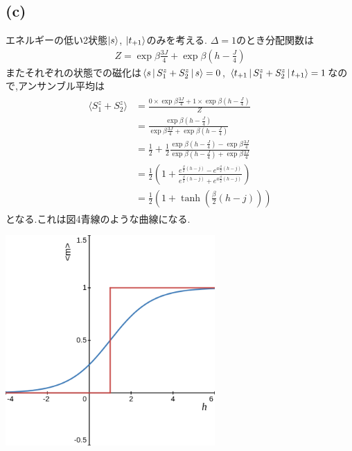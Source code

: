 \documentclass[uplatex,a4j,11pt,dvipdfmx]{jsarticle}
\makeatletter
\def\fgcaption{\def\@captype{figure}\caption}
\def\fgcaption{\def\@captype{figure}\caption}
\makeatother
\begin{document}
\subsection*{(c)}
エネルギーの低い2状態$\Ket{s}$, $\Ket{t_{+1}}$のみを考える.
$\Delta=1$のとき分配関数は
\begin{align}
  Z=\exp{\beta\frac{3J}{4}}+\exp{\beta\left(h-\frac{J}{4}\right)}
\end{align}
またそれぞれの状態での磁化は$\Braket{s|S_1^z+S_2^z|s}=0$, $\Braket{t_{+1}|S_1^z+S_2^z|t_{+1}}=1$なので,アンサンブル平均は
\begin{align}
  \begin{split}
    \langle S_1^z+S_2^z\rangle&=\frac{0\times\exp\beta\frac{3J}{4}+1\times\exp\beta\left(h-\frac{J}{4}\right)}{Z}\\
    &=\frac{\exp\beta\left(h-\frac{J}{4}\right)}{\exp{\beta\frac{3J}{4}}+\exp{\beta\left(h-\frac{J}{4}\right)}}\\
    &=\frac{1}{2}+\frac{1}{2}\frac{\exp{\beta\left(h-\frac{J}{4}\right)}-\exp{\beta\frac{3J}{4}}}{\exp{\beta\left(h-\frac{J}{4}\right)}+\exp{\beta\frac{3J}{4}}}\\
    &=\frac{1}{2}\left(1+\frac{e^{\frac{\beta}{2}\left(h-j\right)}-e^{a\frac{\beta}{2}\left(h-j\right)}}{e^{\frac{\beta}{2}\left(h-j\right)}+e^{a\frac{\beta}{2}\left(h-j\right)}}\right)\\
    &=\frac{1}{2}\left(1+\tanh\left(\frac{\beta}{2}(h-j)\right)\right)
  \end{split}
\end{align}
となる.これは図4青線のような曲線になる.
\begin{center}
  \includegraphics[width=8cm]{mmean.png}
  \fgcaption{青線:正準分布を用いて計算した磁化の期待値,赤線:図2で示した磁化の期待値(Desmosで描画) 共に$J=1$, $\beta=1$とした.}
\end{center}
\end{document}
